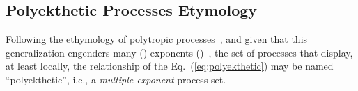     \subsection{Polyekthetic Processes Etymology}

    Following the  ethymology  of  polytropic  processes~\cite{2020-NaaktgeborenC-engrXiv},  and
    given    that    this    generalization    engenders    many    ()    exponents
    ()~\cite{1997-ManiatoglouMPF-Porto}, the set of processes that  display,  at
    least  locally,  the  relationship  of  the   Eq.~(\ref{eq:polyekthetic})   may   be   named
    ``polyekthetic'', i.e., a \emph{multiple exponent} process set.


